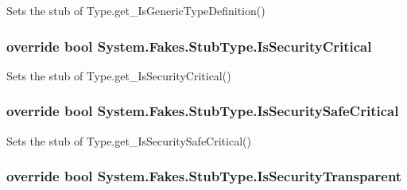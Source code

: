Sets the stub of Type.\-get\-\_\-\-Is\-Generic\-Type\-Definition()

\hypertarget{class_system_1_1_fakes_1_1_stub_type_a6da24a0c853b9d87aed02dad30d122ce}{
\subsubsection[{Is\-Security\-Critical}]{\setlength{\rightskip}{0pt plus 5cm}override bool System.\-Fakes.\-Stub\-Type.\-Is\-Security\-Critical\hspace{0.3cm}{\ttfamily [get]}}}\label{class_system_1_1_fakes_1_1_stub_type_a6da24a0c853b9d87aed02dad30d122ce}


Sets the stub of Type.\-get\-\_\-\-Is\-Security\-Critical()

\hypertarget{class_system_1_1_fakes_1_1_stub_type_ac019488cc1a0786651b1136d5cfa2c0c}{
\subsubsection[{Is\-Security\-Safe\-Critical}]{\setlength{\rightskip}{0pt plus 5cm}override bool System.\-Fakes.\-Stub\-Type.\-Is\-Security\-Safe\-Critical\hspace{0.3cm}{\ttfamily [get]}}}\label{class_system_1_1_fakes_1_1_stub_type_ac019488cc1a0786651b1136d5cfa2c0c}


Sets the stub of Type.\-get\-\_\-\-Is\-Security\-Safe\-Critical()

\hypertarget{class_system_1_1_fakes_1_1_stub_type_a366b3df38fda5ec57579cab2055f525c}{
\subsubsection[{Is\-Security\-Transparent}]{\setlength{\rightskip}{0pt plus 5cm}override bool System.\-Fakes.\-Stub\-Type.\-Is\-Security\-Transparent\hspace{0.3cm}{\ttfamily [get]}}}\label{class_system_1_1_fakes_1_1_stub_type_a366b3df38fda5ec57579cab2055f525c}


